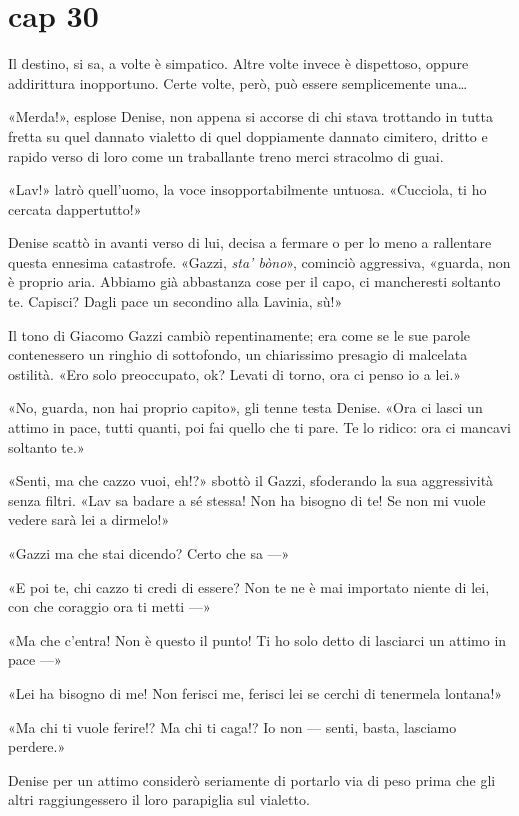 \chapter{cap 30}

Il destino, si sa, a volte è simpatico. Altre volte invece è dispettoso, oppure addirittura inopportuno. Certe volte, però, può essere semplicemente una\ldots{}

«Merda!», esplose Denise, non appena si accorse di chi stava trottando in tutta fretta su quel dannato vialetto di quel doppiamente dannato cimitero, dritto e rapido verso di loro come un traballante treno merci stracolmo di guai.

«Lav!» latrò quell'uomo, la voce insopportabilmente untuosa. «Cucciola, ti ho cercata dappertutto!»

Denise scattò in avanti verso di lui, decisa a fermare o per lo meno a rallentare questa ennesima catastrofe. «Gazzi, \emph{sta' bòno}», cominciò aggressiva, «guarda, non è proprio aria. Abbiamo già abbastanza cose per il capo, ci mancheresti soltanto te. Capisci? Dagli pace un secondino alla Lavinia, sù!»

Il tono di Giacomo Gazzi cambiò repentinamente; era come se le sue parole contenessero un ringhio di sottofondo, un chiarissimo presagio di malcelata ostilità. «Ero solo preoccupato, ok? Levati di torno, ora ci penso io a lei.»

«No, guarda, non hai proprio capito», gli tenne testa Denise. «Ora ci lasci un attimo in pace, tutti quanti, poi fai quello che ti pare. Te lo ridico: ora ci mancavi soltanto te.»

«Senti, ma che cazzo vuoi, eh!?» sbottò il Gazzi, sfoderando la sua aggressività senza filtri. «Lav sa badare a sé stessa! Non ha bisogno di te! Se non mi vuole vedere sarà lei a dirmelo!»

«Gazzi ma che stai dicendo? Certo che sa ---»

«E poi te, chi cazzo ti credi di essere? Non te ne è mai importato niente di lei, con che coraggio ora ti metti ---»

«Ma che c'entra! Non è questo il punto! Ti ho solo detto di lasciarci un attimo in pace ---»

«Lei ha bisogno di me! Non ferisci me, ferisci lei se cerchi di tenermela lontana!»

«Ma chi ti vuole ferire!? Ma chi ti caga!? Io non --- senti, basta, lasciamo perdere.»

Denise  per un attimo considerò seriamente di portarlo via di peso prima che gli altri raggiungessero il loro parapiglia sul vialetto. 

